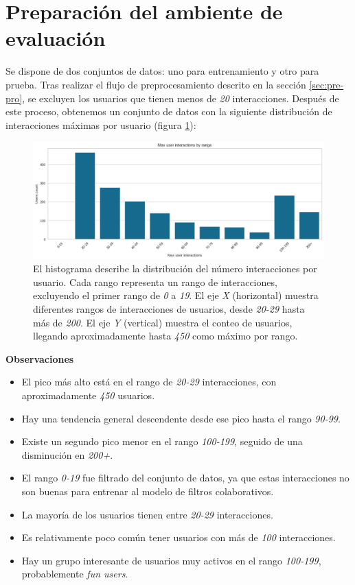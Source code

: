 \documentclass[11pt,a4paper,twoside]{thesis}
\begin{document}
\section{Preparación del ambiente de evaluación}

Se dispone de dos conjuntos de datos: uno para entrenamiento y otro para prueba. Tras realizar el flujo de preprocesamiento descrito en la sección \ref{sec:pre-pro}, se excluyen los usuarios que tienen menos de \textit{20} interacciones. Después de este proceso, obtenemos un conjunto de datos con la siguiente distribución de interacciones máximas por usuario (figura \ref{fig:user-interactions}):

\begin{figure}[h!]
	\centering
	\includegraphics[width=15cm]{./images/user_interactions.png}
	\caption{
		El histograma describe la distribución del número interacciones por usuario. Cada rango representa un rango de interacciones, excluyendo el primer rango de \textit{0} a \textit{19}. El eje \textit{X} (horizontal) muestra diferentes rangos de interacciones de usuarios, desde \textit{20-29} hasta más de \textit{200}. El eje \textit{Y} (vertical) muestra el conteo de usuarios, llegando aproximadamente hasta \textit{450} como máximo por rango.
	}
	\label{fig:user-interactions}
\end{figure}

\textbf{Observaciones}
\begin{itemize}
	\item El pico más alto está en el rango de \textit{20-29} interacciones, con aproximadamente \textit{450} usuarios.
	\item Hay una tendencia general descendente desde ese pico hasta el rango \textit{90-99}.
	\item Existe un segundo pico menor en el rango \textit{100-199}, seguido de una disminución en \textit{200+}.
	\item El rango \textit{0-19} fue filtrado del conjunto de datos, ya que estas interacciones no son buenas para entrenar al modelo de filtros colaborativos.
	\item La mayoría de los usuarios tienen entre \textit{20-29} interacciones.
	\item Es relativamente poco común tener usuarios con más de \textit{100} interacciones.
	\item Hay un grupo interesante de usuarios muy activos en el rango \textit{100-199}, probablemente \textit{fun users}.
\end{itemize}
\end{document}
